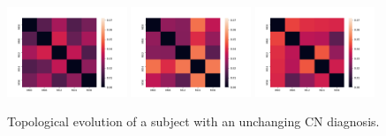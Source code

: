 \documentclass{article}
\begin{document}
\begin{figure}
  \centering \includegraphics[width=0.32\textwidth]{figures/temporal_evolution/ADNI011S0023_h_0.png}
  \hfill \includegraphics[width=0.32\textwidth]{figures/temporal_evolution/ADNI011S0023_h_1.png}
  \hfill
  \includegraphics[width=0.32\textwidth]{figures/temporal_evolution/ADNI011S0023_h_2.png} \caption{Topological
    evolution of a subject with an unchanging CN diagnosis.}
  \label{fig:patient_evolution_stable}
\end{figure}
\end{document}
